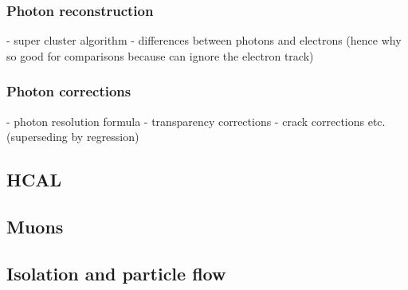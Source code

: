 \subsubsection{Photon reconstruction}
- super cluster algorithm
- differences between photons and electrons (hence why so good for comparisons because can ignore the electron track)

\subsubsection{Photon corrections}
- photon resolution formula
- transparency corrections
- crack corrections etc. (superseding by regression)

\subsection{HCAL}

\subsection{Muons}

\subsection{Isolation and particle flow}






